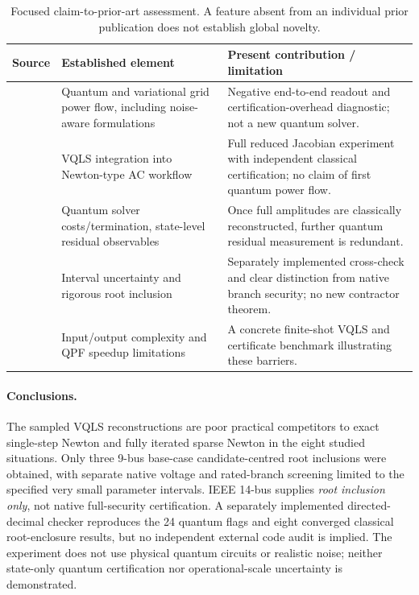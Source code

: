 \documentclass[11pt,a4paper]{article}
\theoremstyle{remark}\newtheorem{remark}[theorem]{Remark}
\begin{document}
\begin{table}[htbp]\centering\footnotesize
\caption{Focused claim-to-prior-art assessment. A feature absent from an individual prior publication does not establish global novelty.}
\begin{tabularx}{\linewidth}{@{}p{29mm}XX@{}}\toprule
Source & Established element & Present contribution / limitation \\\midrule
\citet{feng2021,feng2023,feng2025} & Quantum and variational grid power flow, including noise-aware formulations & Negative end-to-end readout and certification-overhead diagnostic; not a new quantum solver.\\
\citet{ninlawat2026} & VQLS integration into Newton-type AC workflow & Full reduced Jacobian experiment with independent classical certification; no claim of first quantum power flow.\\
\citet{bravo2023,li2026} & Quantum solver costs/termination, state-level residual observables & Once full amplitudes are classically reconstructed, further quantum residual measurement is redundant.\\
\citet{wang1992,pereira2012,krawczyk1969,rump2010} & Interval uncertainty and rigorous root inclusion & Separately implemented cross-check and clear distinction from native branch security; no new contractor theorem.\\
\citet{aaronson2015,pareek2026} & Input/output complexity and QPF speedup limitations & A concrete finite-shot VQLS and certificate benchmark illustrating these barriers.\\
\bottomrule\end{tabularx}
\end{table}

\paragraph{Conclusions.} The sampled VQLS reconstructions are poor practical competitors to exact single-step Newton and fully iterated sparse Newton in the eight studied situations. Only three 9-bus base-case candidate-centred root inclusions were obtained, with separate native voltage and rated-branch screening limited to the specified very small parameter intervals. IEEE 14-bus supplies \emph{root inclusion only}, not native full-security certification. A separately implemented directed-decimal checker reproduces the 24 quantum flags and eight converged classical root-enclosure results, but no independent external code audit is implied. The experiment does not use physical quantum circuits or realistic noise; neither state-only quantum certification nor operational-scale uncertainty is demonstrated.
\end{document}
